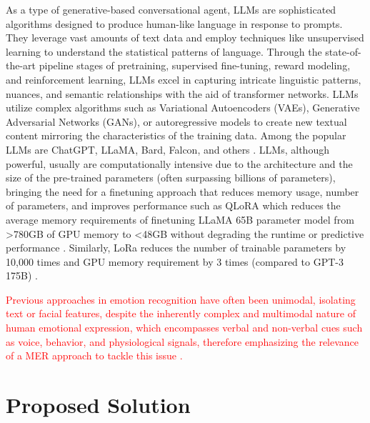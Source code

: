 \documentclass[runningheads]{llncs}
\begin{document}
As a type of generative-based conversational agent, LLMs are sophisticated algorithms designed to produce human-like language in response to prompts. They leverage vast amounts of text data and employ techniques like unsupervised learning to understand the statistical patterns of language. Through the state-of-the-art pipeline stages of pretraining, supervised fine-tuning, reward modeling, and reinforcement learning, LLMs excel in capturing intricate linguistic patterns, nuances, and semantic relationships with the aid of transformer networks. LLMs utilize complex algorithms such as Variational Autoencoders (VAEs), Generative Adversarial Networks (GANs), or autoregressive models to create new textual content mirroring the characteristics of the training data. Among the popular LLMs are ChatGPT, LLaMA, Bard, Falcon, and others \cite{Hai_LLM_2023}. LLMs, although powerful, usually are computationally intensive due to the architecture and the size of the pre-trained parameters (often surpassing billions of parameters), bringing the need for a finetuning approach that reduces memory usage, number of parameters, and improves performance such as QLoRA which reduces the average memory requirements of finetuning  LLaMA 65B parameter model from >780GB of GPU memory to <48GB without degrading the runtime or predictive performance \cite{dettmers_qlora_2023}. Similarly, LoRa reduces the number of trainable parameters by 10,000 times and GPU memory requirement by 3 times (compared to GPT-3 175B) \cite{hu_lora_2021}. 

\textcolor{red}{Previous approaches in \textcolor{red}{emotion recognition} have often been unimodal, isolating text or facial features, despite the inherently complex and multimodal nature of human emotional expression, which encompasses verbal and non-verbal cues such as voice, behavior, and physiological signals, therefore emphasizing the relevance of a MER approach to tackle this issue \cite{ezzameli_emotion_2023, zhu_multimodal_2023}.}

\section{Proposed Solution}
\label{sec:solution}
\end{document}
